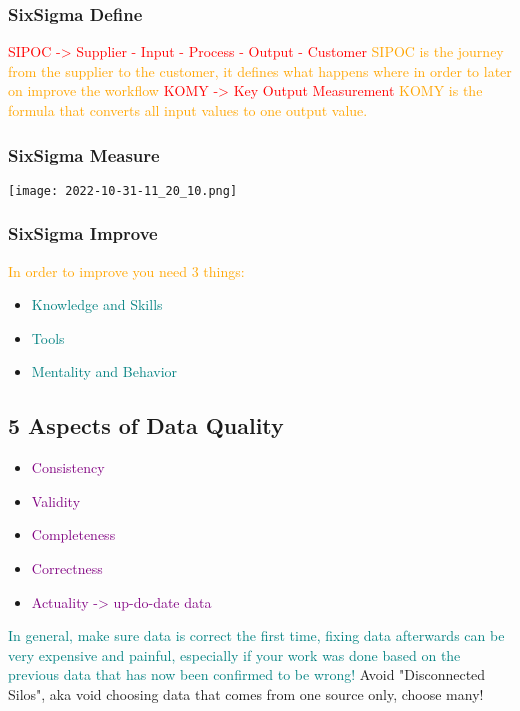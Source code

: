 \documentclass[main.tex,fontsize=12pt,paper=a4,paper=landscape,DIV=calc,]{scrartcl}
\begin{document}
\begin{multicols*}{2}
\subsubsection{SixSigma Define}
\textcolor{red}{SIPOC -> Supplier - Input - Process - Output - Customer}\newline
\textcolor{orange}{SIPOC is the journey from the supplier to the customer, \newline
it defines what happens where in order to later on improve the workflow}\newline
\textcolor{red}{KOMY -> Key Output Measurement}\newline
\textcolor{orange}{KOMY is the formula that converts all input values to one output value.}

\subsubsection{SixSigma Measure} 
\texttt{[image: 2022-10-31-11\_20\_10.png]}

\subsubsection{SixSigma Improve} 
\textcolor{orange}{In order to improve you need 3 things:}\newline
\begin{itemize}
\item \textcolor{teal}{Knowledge and Skills}
\item \textcolor{teal}{Tools}
\item \textcolor{teal}{Mentality and Behavior}
\end{itemize}

\subsection{5 Aspects of Data Quality}
\begin{itemize}
\item \textcolor{purple}{Consistency}
\item \textcolor{purple}{Validity}
\item \textcolor{purple}{Completeness}
\item \textcolor{purple}{Correctness}
\item \textcolor{purple}{Actuality -> up-do-date data}
\end{itemize} 
\textcolor{teal}{In general, make sure data is correct the first time, fixing data afterwards can be very expensive and painful, especially if your work was done based on the previous data that has now been confirmed to be wrong!}\newline
Avoid "Disconnected Silos", aka void choosing data that comes from one source only, choose many!


\end{multicols*}
\end{document}
